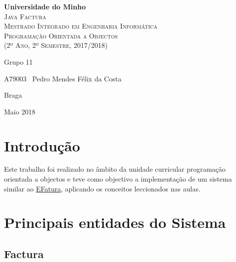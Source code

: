 \documentclass[12pt,a4paper]{report}
\begin{document}
\begin{titlepage}
    \center
    {\huge {\bf Universidade do Minho}}\\[0.4cm]
    \vspace{3.0cm}
    \textsc{\huge{Java Factura}}\\[0.5cm]
    \vspace{3.0cm}
    \textsc{\huge{Mestrado Integrado em Engenharia Informática}}\\[0.5cm]
    \vspace{2.0cm}
    \textsc{Programação Orientada a Objectos}\\[0.5cm]
    \textsc{(2º Ano, 2º Semestre, 2017/2018)}\\[0.5cm]
    \vspace{1.5cm}
    \begin{flushleft}
        Grupo 11
        \vspace{1cm}

        A79003 \,\,\,Pedro Mendes Félix da Costa
    \end{flushleft}
        \vspace{1cm}
    \begin{flushright}
        Braga

        Maio 2018
    \end{flushright}

\end{titlepage}

\tableofcontents
\listoffigures

\chapter{Introdução}
    Este trabalho foi realizado no âmbito da unidade curricular programação
    orientada a objectos e teve como objectivo a implementação de um sistema
    similar ao \href{https://faturas.portaldasfinancas.gov.pt}{EFatura},
    aplicando os conceitos leccionados nas aulas.

\chapter{Principais entidades do Sistema}
    \section{Factura}
\end{document}
